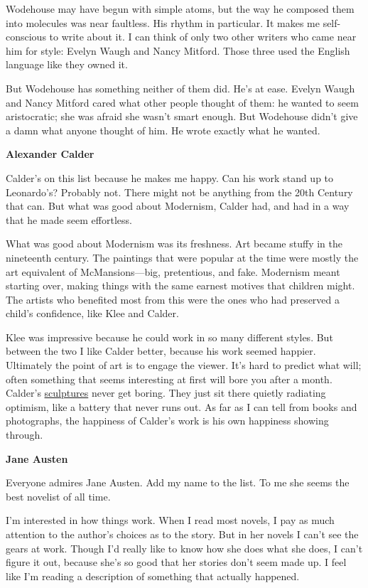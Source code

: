 \documentclass[12pt]{book}
\begin{document}
Wodehouse may have begun with simple atoms, but the way he composed them
into molecules was near faultless. His rhythm in particular. It makes me
self-conscious to write about it. I can think of only two other writers
who came near him for style: Evelyn Waugh and Nancy Mitford. Those three
used the English language like they owned it.

But Wodehouse has something neither of them did. He's at ease. Evelyn
Waugh and Nancy Mitford cared what other people thought of them: he
wanted to seem aristocratic; she was afraid she wasn't smart enough. But
Wodehouse didn't give a damn what anyone thought of him. He wrote
exactly what he wanted.

\textbf{Alexander Calder}

Calder's on this list because he makes me happy. Can his work stand up
to Leonardo's? Probably not. There might not be anything from the 20th
Century that can. But what was good about Modernism, Calder had, and had
in a way that he made seem effortless.

What was good about Modernism was its freshness. Art became stuffy in
the nineteenth century. The paintings that were popular at the time were
mostly the art equivalent of McMansions---big, pretentious, and fake.
Modernism meant starting over, making things with the same earnest
motives that children might. The artists who benefited most from this
were the ones who had preserved a child's confidence, like Klee and
Calder.

Klee was impressive because he could work in so many different styles.
But between the two I like Calder better, because his work seemed
happier. Ultimately the point of art is to engage the viewer. It's hard
to predict what will; often something that seems interesting at first
will bore you after a month. Calder's
\href{https://www.flickr.com/photos/uergevich/7029234689/}{sculptures}
never get boring. They just sit there quietly radiating optimism, like a
battery that never runs out. As far as I can tell from books and
photographs, the happiness of Calder's work is his own happiness showing
through.

\textbf{Jane Austen}

Everyone admires Jane Austen. Add my name to the list. To me she seems
the best novelist of all time.

I'm interested in how things work. When I read most novels, I pay as
much attention to the author's choices as to the story. But in her
novels I can't see the gears at work. Though I'd really like to know how
she does what she does, I can't figure it out, because she's so good
that her stories don't seem made up. I feel like I'm reading a
description of something that actually happened.
\end{document}
